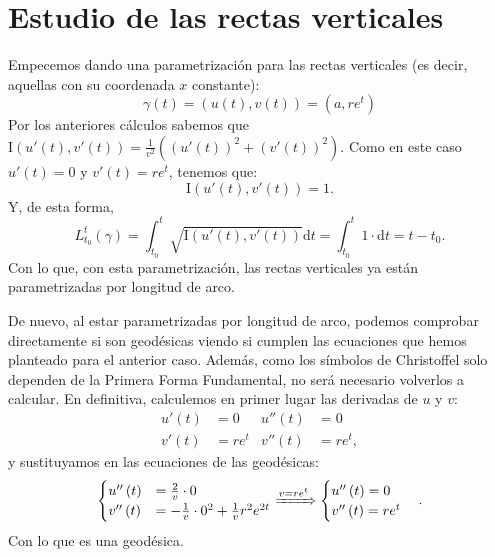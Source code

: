 \section{Estudio de las rectas verticales}
Empecemos dando una parametrización para las rectas verticales (es decir,
aquellas con su coordenada $x$ constante):
\[
\gamma\left( t \right) = \left( u\left( t \right), v\left( t \right) \right) =
\left( a, re^t \right)
\]
Por los anteriores cálculos sabemos que $\mathrm{I}\left( u'\left( t \right), v'\left( t \right) \right) =
\frac{1}{v^2}\left( \left( u'\left( t \right) \right)^2 + \left( v'\left( t
\right) \right)^2 \right)$. Como en este caso $u'\left( t \right) = 0$ y
$v'\left( t \right) = r e^t$, tenemos que:
\[
\mathrm{I} \left( u'\left( t \right), v'\left( t
\right) \right) = 1.
\]
Y, de esta forma,
\[
L_{t_0}^t \left( \gamma \right) = \int_{t_0}^{t}
\sqrt{\mathrm{I} \left( u'\left( t \right), v'\left(
t \right) \right)} \mathrm{d}t = \int_{t_0}^{t} 1 \cdot \mathrm{d}t = t - t_0.
\]
Con lo que, con esta parametrización, las rectas verticales ya están
parametrizadas por longitud de arco.

De nuevo, al estar parametrizadas por longitud de arco, podemos comprobar
directamente si son geodésicas viendo si cumplen las ecuaciones que hemos
planteado para el anterior caso. Además, como los símbolos de Christoffel solo
dependen de la Primera Forma Fundamental, no será necesario volverlos a
calcular. En definitiva, calculemos en primer lugar las derivadas de $u$ y $v$:
\begin{align*}
    u'\left( t \right) &= 0 & u''\left( t \right) &= 0\\
    v'\left( t \right) &= r e^t & v''\left( t \right) &= re^t,
\end{align*}
y sustituyamos en las ecuaciones de las geodésicas:
\[
\begin{cases}
    u''\left( t \right) &= \frac{2}{v} \cdot 0\\
    v''\left( t \right) &= - \frac{1}{v} \cdot 0^2 + \frac{1}{v} r^2 e^{2t} 
\end{cases} \xRightarrow{v = re^t} \begin{cases}
    u''\left( t \right) = 0\\
    v''\left( t \right) = re^t
\end{cases}.
\]
Con lo que es una geodésica.
